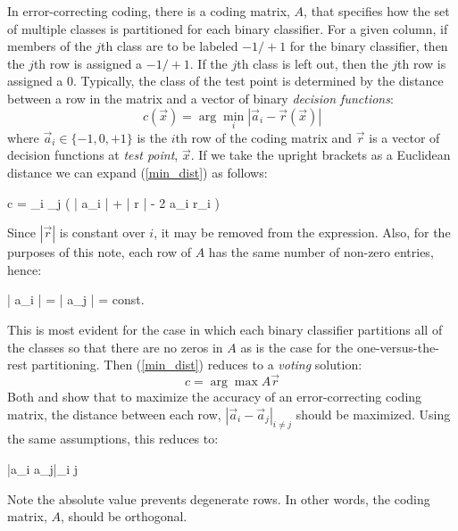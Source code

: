 In error-correcting coding, there is a coding matrix, $A$, that specifies
how the set of multiple classes is partitioned for each binary classifier.
For a given column, 
if members of the $j$th class are to be labeled $-1/+1$ for the
binary classifier, then the $j$th row is assigned a $-1/+1$.
If the $j$th class is left out, then the $j$th row is assigned a $0$.
Typically, the class of the test point is determined by the distance between
a row in the matrix and a vector of binary {\it decision functions}:
\begin{equation}
	c(\vec x) = \arg \min_i | \vec a_i - \vec r(\vec x) |
	\label{min_dist}
\end{equation}
where $\vec a_i\in \lbrace -1,0,+1 \rbrace$ 
is the $i$th row of the coding matrix and 
$\vec r$ is a vector of decision functions at {\it test point}, $\vec x$.
If we take the upright brackets as a Euclidean distance we can expand (\ref{min_dist}) as follows:
\begin{eqnnon}
	c = \arg \min_i \sum_j \left ( | \vec a_i | + | \vec r | - 2 \vec a_i  \cdot \vec r_i  \right ) 
\end{eqnnon}
Since $| \vec r |$ is constant over $i$, it may be removed from the expression.
Also, for the purposes of this note,
each row of $A$ has the same number of non-zero entries, hence:
\begin{eqnnon}
	| \vec a_i | = | \vec a_j | = const.
\end{eqnnon}
This is most evident for the case in which each binary classifier partitions
all of the classes so that there are no zeros in $A$
as is the case for the one-versus-the-rest partitioning.
Then (\ref{min_dist}) reduces to a {\it voting} solution:
\begin{equation}
	c = \arg \max A \vec r \label{voting}
\end{equation}
Both \citet{Allwein_etal2000} and \citet{Windeatt_Ghaderi2002} show that to
maximize the accuracy of an error-correcting coding matrix, the distance
between each row, $|\vec a_i - \vec a_j|_{i \ne j}$ should be maximized.
Using the same assumptions, this reduces to:
\begin{eqnnon}
	\min |\vec a_i \cdot \vec a_j|_{i \ne j}
\end{eqnnon}
Note the absolute value prevents degenerate rows.
In other words, the coding matrix, $A$, should be orthogonal.

